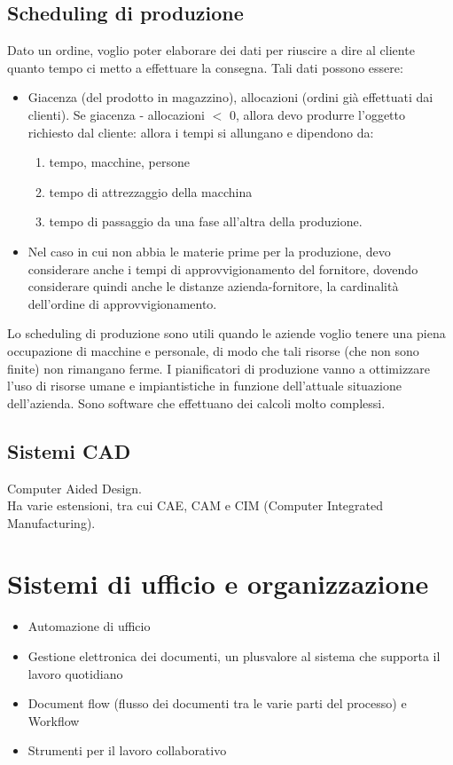 \subsection{Scheduling di produzione}
\label{sub:Scheduling di produzione}
Dato un ordine, voglio poter elaborare dei dati per riuscire a dire
al cliente quanto tempo ci metto a effettuare la consegna. Tali dati possono essere:
\begin{itemize}
  \item Giacenza (del prodotto in magazzino), allocazioni (ordini gi\`a effettuati dai clienti).
  Se giacenza - allocazioni $<$ 0, allora devo produrre l'oggetto richiesto
  dal cliente: allora i tempi si allungano e dipendono da:
  \begin{enumerate}
    \item tempo, macchine, persone
    \item tempo di attrezzaggio della macchina
    \item tempo di passaggio da una fase all'altra della produzione.
  \end{enumerate}
  \item
  Nel caso in cui non abbia le materie prime per la produzione, devo considerare
  anche i tempi di approvvigionamento del fornitore, dovendo considerare quindi
  anche le distanze azienda-fornitore, la cardinalit\`a dell'ordine di approvvigionamento.
\end{itemize}
Lo scheduling di produzione sono utili quando le aziende voglio tenere una piena occupazione
di macchine e personale, di modo che tali risorse (che non sono finite) non rimangano ferme.
I pianificatori di produzione vanno a ottimizzare l'uso di risorse umane e impiantistiche in funzione
dell'attuale situazione dell'azienda. Sono software che effettuano dei calcoli molto complessi.
\subsection{Sistemi CAD}
\label{sub:Sistemi CAD}
Computer Aided Design.\\
Ha varie estensioni, tra cui CAE, CAM e CIM (Computer Integrated Manufacturing).
\section{Sistemi di ufficio e organizzazione}
\label{sec:Sistemi di ufficio e organizzazione}
\begin{itemize}
  \item Automazione di ufficio
  \item Gestione elettronica dei documenti, un plusvalore al sistema che supporta il lavoro quotidiano
  \item Document flow (flusso dei documenti tra le varie parti del processo) e Workflow
  \item Strumenti per il lavoro collaborativo
\end{itemize}
